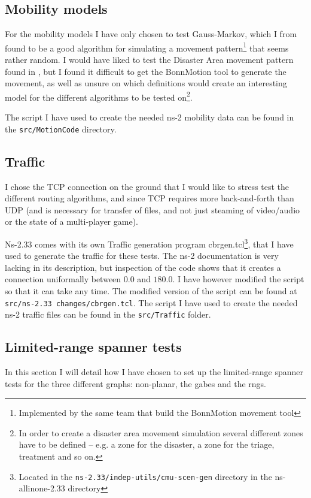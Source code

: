 \subsection{Mobility models}
\label{section:mobilty_model}
For the mobility models I have only chosen to test Gauss-Markov, which I from \cite{MobilityAdHocResearch} found to be a good algorithm for simulating a movement pattern\footnote{Implemented by the same team that build the BonnMotion movement tool} that seems rather random. I would have liked to test the Disaster Area movement pattern found in \cite{disasterArea}, but I found it difficult to get the BonnMotion tool to generate the movement, as well as unsure on which definitions would create an interesting model for the different algorithms to be tested on\footnote{In order to create a disaster area movement simulation several different zones have to be defined -- e.g. a zone for the disaster, a zone for the triage, treatment and so on.}. 

The script I have used to create the needed ns-2 mobility data can be found in the \texttt{src/MotionCode} directory.

\subsection{Traffic}
\label{section:traffic_model}
I chose the TCP connection on the ground that I would like to stress test the different routing algorithms, and since TCP requires more back-and-forth than UDP (and is necessary for transfer of files, and not just steaming of video/audio or the state of a multi-player game).

Ns-2.33 comes with its own Traffic generation program cbrgen.tcl\footnote{Located in the \texttt{ns-2.33/indep-utils/cmu-scen-gen} directory in the ns-allinone-2.33 directory}, that I have used to generate the traffic for these tests. The ns-2 documentation is very lacking in its description, but inspection of the code shows that it creates a connection uniformally between $0.0$ and $180.0$. I have however modified the script so that it can take any time. The modified version of the script can be found at \texttt{src/ns-2.33 changes/cbrgen.tcl}. The script I have used to create the needed ns-2 traffic files can be found in the \texttt{src/Traffic} folder.

\subsection{Limited-range spanner tests}
\label{section:test_desc_spanners}
In this section I will detail how I have chosen to set up the limited-range spanner tests for the three different graphs: non-planar, the \acp{gabe} and the \acp{rng}.

